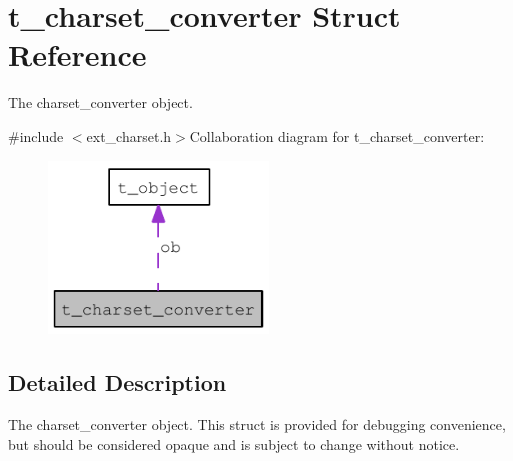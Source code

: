 \hypertarget{structt__charset__converter}{
\section{t\_\-charset\_\-converter Struct Reference}
\label{structt__charset__converter}
}


The charset\_\-converter object.  


{\ttfamily \#include $<$ext\_\-charset.h$>$}Collaboration diagram for t\_\-charset\_\-converter:\nopagebreak
\begin{figure}[H]
\begin{center}
\leavevmode
\includegraphics[width=166pt]{structt__charset__converter__coll__graph}
\end{center}
\end{figure}


\subsection{Detailed Description}
The charset\_\-converter object. This struct is provided for debugging convenience, but should be considered opaque and is subject to change without notice. 